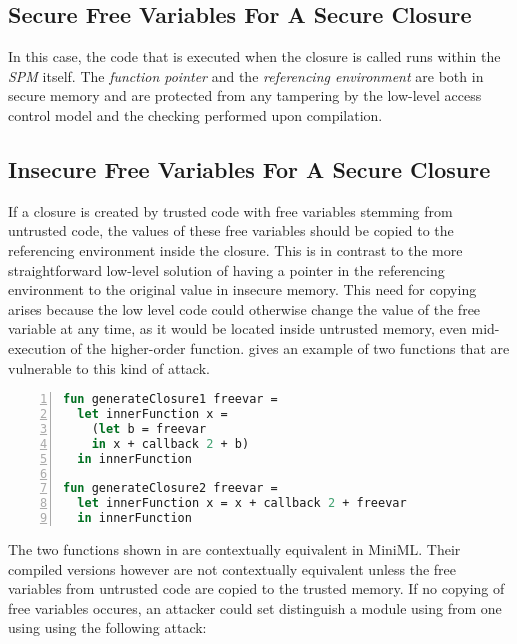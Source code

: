 \subsection{Secure Free Variables For A Secure Closure}

In this case, the code that is executed when the closure is called runs within the \emph{SPM} itself.
The \emph{function pointer} and the \emph{referencing environment} are both in secure memory and are protected from any tampering by the low-level access control model and the checking performed upon compilation.

\subsection{Insecure Free Variables For A Secure Closure}
If a closure is created by trusted code with free variables stemming from untrusted code, the values of these free variables should be copied to the referencing environment inside the closure. This is in contrast to the more straightforward low-level solution of having a pointer in the referencing environment to the original value in insecure memory.
This need for copying arises because the low level code could otherwise change the value of the free variable at any time, as it would be located inside untrusted memory, even mid-execution of the higher-order function.
 gives an example of two functions that are vulnerable to this kind of attack.

\begin{lstlisting}[frame=single, language=ML,caption={[Copy Free Variables]Changing free variables inside untrusted memory mid-execution can break contextual equivalence.}, label=code:CopyFreeVariables,numbers=left]
fun generateClosure1 freevar =
  let innerFunction x =
    (let b = freevar
    in x + callback 2 + b)
  in innerFunction

fun generateClosure2 freevar = 
  let innerFunction x = x + callback 2 + freevar
  in innerFunction
\end{lstlisting}

The two functions shown in  are contextually equivalent in \mbox{MiniML}.
Their compiled versions however are not contextually equivalent unless the free variables from untrusted code are copied to the trusted memory.
If no copying of free variables occures, an attacker could set distinguish a module using  from one using  using the following attack:


